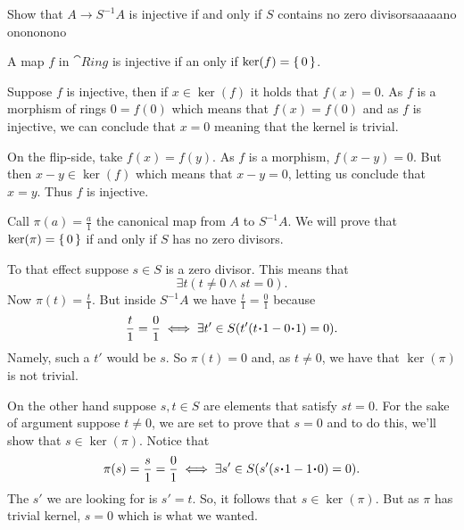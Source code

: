 \documentclass[12pt]{memoir}
\begin{document}
    \begin{Ej}[1.3.C]
        Show that $A\to S^{-1}A$ is injective if and only if $S$ contains no
        zero divisorsaaaaano onononono
    \end{Ej}
    
    \begin{Lem}
    A map $f$ in $\cat{Ring}$ is injective if an only if $\ker(f)=\{\,0\,\}$.
    \end{Lem}
    
    \begin{ptcbp}
    Suppose $f$ is injective, then if $x\in\ker(f)$ it holds that $f(x)=0$. As $f$ is a morphism of rings $0=f(0)$ which means that $f(x)=f(0)$ and as $f$ is injective, we can conclude that $x=0$ meaning that the kernel is trivial.\par 
    On the flip-side, take $f(x)=f(y)$. As $f$ is a morphism, $f(x-y)=0$. But then $x-y\in\ker(f)$ which means that $x-y=0$, letting us conclude that $x=y$. Thus $f$ is injective.
    \end{ptcbp}
    
    \begin{ptcbr}
    Call $\pi(a)=\frac{a}{1}$ the canonical map from $A$ to $S^{-1}A$. We will prove that $\ker(\pi)=\{\,0\,\}$ if and only if $S$ has no zero divisors. \par 
    To that effect suppose $s\in S$ is a zero divisor. This means that 
    $$\exists t (t\neq 0\land st=0).$$
    Now $\pi(t)=\frac{t}{1}$. But inside $S^{-1}A$ we have $\frac{t}{1}=\frac{0}{1}$ because 
    $$\frac{t}{1}=\frac{0}{1}\iff \exists t'\in S(t'(t\.1-0\.1)=0).$$
    Namely, such a $t'$ would be $s$. So $\pi(t)=0$ and, as $t\neq 0$, we have that $\ker(\pi)$ is not trivial.\par 
    On the other hand suppose $s,t\in S$ are elements that satisfy $st=0$. For the sake of argument suppose $t\neq 0$, we are set to prove that $s=0$ and to do this, we'll show that $s\in\ker(\pi)$. Notice that 
    $$\pi(s)=\frac{s}{1}=\frac{0}{1}\iff \exists s'\in S(s'(s\.1-1\.0)=0).$$
    The $s'$ we are looking for is $s'=t$. So, it follows that $s\in\ker(\pi)$. But as $\pi$ has trivial kernel, $s=0$ which is what we wanted. 
    \end{ptcbr}
\end{document}
